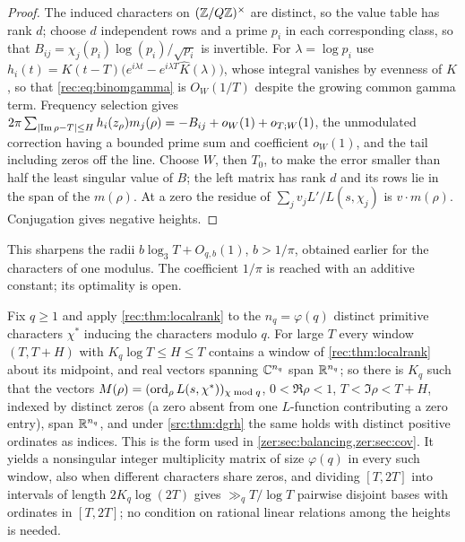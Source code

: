 \begin{proof}
The induced characters on $(\mathbb{Z}/Q\mathbb{Z})^\times$ are distinct, so the value table has rank $d$; choose $d$
independent rows and a prime $p_i$ in each corresponding class, so that
$B_{ij}=\chi_j(p_i)\log(p_i)/\sqrt{p_i}$ is invertible. For $\lambda=\log p_i$ use
$h_i(t)=K(t-T)\bigl(e^{i\lambda t}-e^{i\lambda T}\widehat K(\lambda)\bigr)$, whose integral vanishes by evenness of $K$,
so that \eqref{rec:eq:binomgamma} is $O_W(1/T)$ despite the growing common gamma term. Frequency
selection gives $2\pi\sum_{\lvert\operatorname{Im}\rho-T\rvert\le H}h_i(z_\rho)m_j(\rho)=-B_{ij}+o_W(1)+o_{T;W}(1)$, the unmodulated
correction having a bounded prime sum and coefficient $o_W(1)$, and the tail including zeros off
the line. Choose $W$, then $T_0$, to make the error smaller than half the least singular value of
$B$; the left matrix has rank $d$ and its rows lie in the span of the $m(\rho)$. At a zero the residue
of $\sum_jv_jL'/L(s,\chi_j)$ is $v\cdot m(\rho)$. Conjugation gives negative heights.
\end{proof}

This sharpens the radii $b\log_3T+O_{q,b}(1)$, $b>1/\pi$, obtained earlier for the characters of one
modulus. The coefficient $1/\pi$ is reached with an additive constant; its optimality is open.

\begin{remark}\label{zer:thm:rank}
Fix $q\ge1$ and apply \cref{rec:thm:localrank} to the $n_q=\varphi(q)$ distinct primitive characters
$\chi^*$ inducing the characters modulo $q$. For large $T$ every window $(T,T+H)$ with
$K_q\log T\le H\le T$ contains a window of \cref{rec:thm:localrank} about its midpoint, and real vectors
spanning $\mathbb{C}^{n_q}$ span $\mathbb{R}^{n_q}$; so there is $K_q$ such that the vectors
$M(\rho)=(\operatorname{ord}_\rho L(s,\chi^*))_{\chi\bmod q}$, $0<\Re\rho<1$, $T<\Im\rho<T+H$, indexed by distinct zeros
(a zero absent from one $L$-function contributing a zero entry), span $\mathbb{R}^{n_q}$, and under
\cref{src:thm:dgrh} the same holds with distinct positive ordinates as indices. This is the form used in
\cref{zer:sec:balancing,zer:sec:cov}. It yields a nonsingular integer multiplicity matrix of size $\varphi(q)$
in every such window, also when different characters share zeros, and dividing $[T,2T]$ into intervals of
length $2K_q\log(2T)$ gives $\gg_qT/\log T$ pairwise disjoint bases with ordinates in $[T,2T]$; no condition
on rational linear relations among the heights is needed.
\end{remark}

